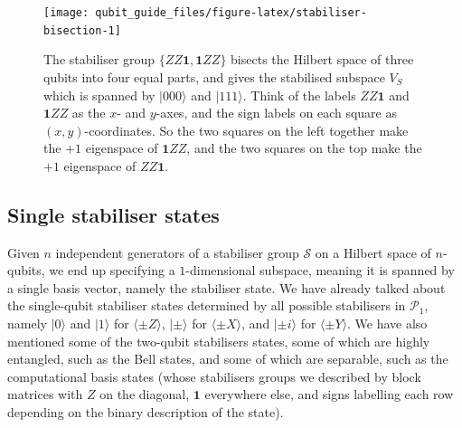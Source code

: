 \documentclass[fleqn,a4paper]{article}
\theoremstyle{definition}
\theoremstyle{definition}
\theoremstyle{definition}
\theoremstyle{definition}
\theoremstyle{remark}
\begin{document}
\begin{figure}[H]

{\centering \texttt{[image: qubit\_guide\_files/figure-latex/stabiliser-bisection-1]} 

}

\caption{The stabiliser group \(\{ZZ\mathbf{1},\mathbf{1}ZZ\}\) bisects the Hilbert space of three qubits into four equal parts, and gives the stabilised subspace \(V_S\) which is spanned by \(|000\rangle\) and \(|111\rangle\). Think of the labels \(ZZ\mathbf{1}\) and \(\mathbf{1}ZZ\) as the \(x\)- and \(y\)-axes, and the sign labels on each square as \((x,y)\)-coordinates. So the two squares on the left together make the \(+1\) eigenspace of \(\mathbf{1}ZZ\), and the two squares on the top make the \(+1\) eigenspace of \(ZZ\mathbf{1}\).}\label{fig:stabiliser-bisection}
\end{figure}

\hypertarget{single-stabiliser-states}{%
\subsection{Single stabiliser states}\label{single-stabiliser-states}}

Given \(n\) independent generators of a stabiliser group \(\mathcal{S}\) on a Hilbert space of \(n\)-qubits, we end up specifying a \(1\)-dimensional subspace, meaning it is spanned by a single basis vector, namely the stabiliser state.
We have already talked about the single-qubit stabiliser states determined by all possible stabilisers in \(\mathcal{P}_1\), namely \(|0\rangle\) and \(|1\rangle\) for \(\langle \pm Z\rangle\), \(|\pm\rangle\) for \(\langle \pm X\rangle\), and \(|\pm i\rangle\) for \(\langle \pm Y\rangle\).
We have also mentioned some of the two-qubit stabilisers states, some of which are highly entangled, such as the Bell states, and some of which are separable, such as the computational basis states (whose stabilisers groups we described by block matrices with \(Z\) on the diagonal, \(\mathbf{1}\) everywhere else, and signs labelling each row depending on the binary description of the state).
\end{document}
